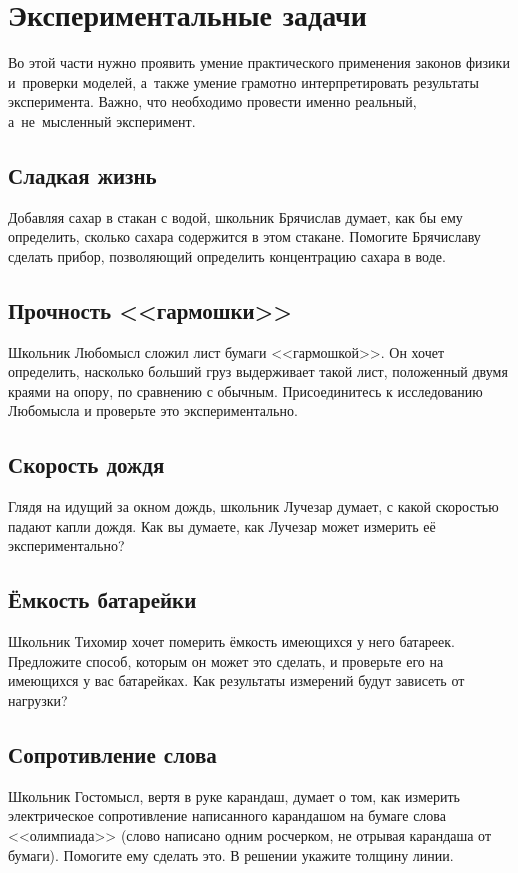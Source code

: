 \documentclass[a4paper,12pt]{article}
\begin{document}
\newpage

\section{Экспериментальные задачи}

Во этой части нужно проявить умение практического применения законов физики
и~проверки моделей, а~также умение грамотно интерпретировать результаты
эксперимента. Важно, что необходимо провести именно реальный,
а~не~мысленный эксперимент.

\subsection{Сладкая жизнь}
Добавляя сахар в стакан с водой, школьник Брячислав думает, как бы ему определить,
сколько сахара содержится в этом стакане. Помогите Брячиславу сделать прибор, позволяющий
определить концентрацию сахара в воде.

\subsection{Прочность <<гармошки>>}
Школьник Любомысл сложил лист бумаги <<гармошкой>>. Он хочет определить, насколько б\emph{о}льший
груз выдерживает такой лист, положенный двумя краями на опору, по сравнению с обычным.
Присоединитесь к исследованию Любомысла и проверьте это экспериментально.

\subsection{Скорость дождя}
Глядя на идущий за окном дождь, школьник Лучезар думает, с какой скоростью падают капли дождя.
Как вы думаете, как Лучезар может измерить её экспериментально?

\subsection{Ёмкость батарейки}
Школьник Тихомир хочет померить ёмкость имеющихся у него батареек. Предложите способ,
которым он может это сделать, и проверьте его на имеющихся у вас батарейках.
Как результаты измерений будут зависеть от нагрузки?

\subsection{Сопротивление слова}
Школьник Гостомысл, вертя в руке карандаш, думает о том, как измерить электрическое
сопротивление написанного карандашом на бумаге слова <<олимпиада>> (слово написано
одним росчерком, не отрывая карандаша от бумаги). Помогите ему сделать это.
В решении укажите толщину линии.
\end{document}
